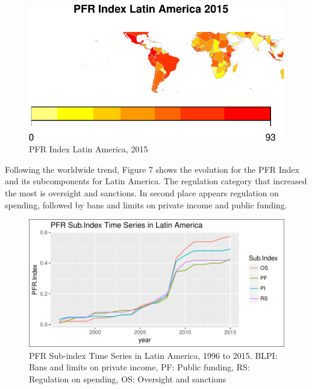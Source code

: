\documentclass[12,twoside]{article}
\begin{document}
\begin{figure}[h]

{\centering \includegraphics{thesis_body_files/figure-latex/figure_vi-1} 

}

\caption{PFR Index Latin America, 2015}\label{fig:figure_vi}
\end{figure}

Following the worldwide trend, Figure 7 shows the evolution for the PFR
Index and its subcomponents for Latin America. The regulation category
that increased the most is oversight and sanctions. In second place
appears regulation on spending, followed by bans and limits on private
income and public funding. \pagebreak

\begin{figure}[h]

{\centering \includegraphics{thesis_body_files/figure-latex/figure_vii-1} 

}

\caption{PFR Sub-index Time Series in Latin America, 1996 to 2015. BLPI: Bans and limits on private income, PF: Public funding, RS: Regulation on spending, OS: Oversight and sanctions}\label{fig:figure_vii}
\end{figure}
\end{document}
